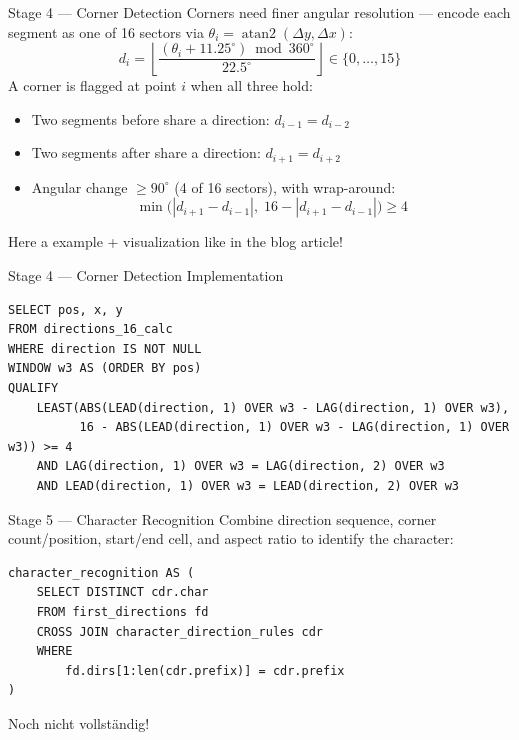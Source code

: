 \documentclass[aspectratio=169, 12pt]{beamer}
\begin{document}
\begin{frame}[fragile]{Stage 4 — Corner Detection}
  Corners need finer angular resolution — encode each segment as one of
  16 sectors via $\theta_i = \operatorname{atan2}(\Delta y, \Delta x)$:
  \[
    d_i = \left\lfloor
      \frac{(\theta_i + 11.25^\circ) \bmod 360^\circ}{22.5^\circ}
    \right\rfloor \in \{0, \dots, 15\}
  \]
  A corner is flagged at point $i$ when all three hold:
  \begin{itemize}
    \item Two segments before share a direction: $d_{i-1} = d_{i-2}$
    \item Two segments after share a direction: $d_{i+1} = d_{i+2}$
    \item Angular change $\geq 90^\circ$ (4 of 16 sectors), with wrap-around:
      \[
        \min\!\bigl(|d_{i+1} - d_{i-1}|,\; 16 - |d_{i+1} - d_{i-1}|\bigr) \geq 4
      \]
  \end{itemize}

  \alert{Here a example + visualization like in the blog article!}
\end{frame}

\begin{frame}[fragile]{Stage 4 — Corner Detection Implementation}
  \begin{lstlisting}[basicstyle=\ttfamily\footnotesize]
SELECT pos, x, y
FROM directions_16_calc
WHERE direction IS NOT NULL
WINDOW w3 AS (ORDER BY pos)
QUALIFY
    LEAST(ABS(LEAD(direction, 1) OVER w3 - LAG(direction, 1) OVER w3),
          16 - ABS(LEAD(direction, 1) OVER w3 - LAG(direction, 1) OVER w3)) >= 4
    AND LAG(direction, 1) OVER w3 = LAG(direction, 2) OVER w3
    AND LEAD(direction, 1) OVER w3 = LEAD(direction, 2) OVER w3
  \end{lstlisting}
\end{frame}

\begin{frame}[fragile]{Stage 5 — Character Recognition}
  Combine direction sequence, corner count/position, start/end cell,
  and aspect ratio to identify the character:

  \begin{lstlisting}[basicstyle=\ttfamily\footnotesize]
character_recognition AS (
    SELECT DISTINCT cdr.char
    FROM first_directions fd
    CROSS JOIN character_direction_rules cdr
    WHERE
        fd.dirs[1:len(cdr.prefix)] = cdr.prefix
)
  \end{lstlisting}
  \alert{Noch nicht vollständig!}
\end{frame}
\end{document}
